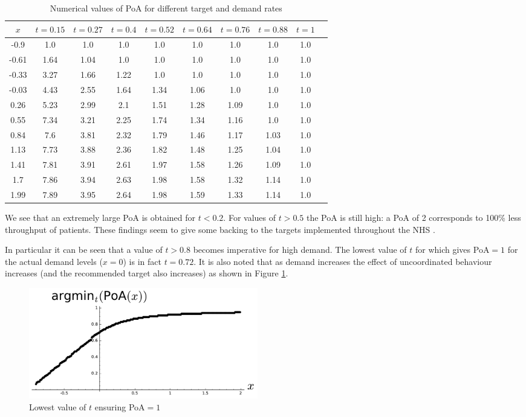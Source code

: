 \documentclass{article}
\begin{document}
\begin{table}[!htbp]
\begin{center}
\begin{tabular}{c|ccccccccc}
\toprule
$x$&$t=0.15$&$t=0.27$&$t=0.4$&$t=0.52$&$t=0.64$&$t=0.76$&$t=0.88$&$t=1$\\
\midrule
-0.9  & 1.0  & 1.0  & 1.0  & 1.0  & 1.0  & 1.0  & 1.0  & 1.0\\
-0.61 & 1.64 & 1.04 & 1.0  & 1.0  & 1.0  & 1.0  & 1.0  & 1.0\\
-0.33 & 3.27 & 1.66 & 1.22 & 1.0  & 1.0  & 1.0  & 1.0  & 1.0\\
-0.03 & 4.43 & 2.55 & 1.64 & 1.34 & 1.06 & 1.0  & 1.0  & 1.0\\
0.26  & 5.23 & 2.99 & 2.1  & 1.51 & 1.28 & 1.09 & 1.0  & 1.0\\
0.55  & 7.34 & 3.21 & 2.25 & 1.74 & 1.34 & 1.16 & 1.0  & 1.0\\
0.84  & 7.6  & 3.81 & 2.32 & 1.79 & 1.46 & 1.17 & 1.03 & 1.0\\
1.13  & 7.73 & 3.88 & 2.36 & 1.82 & 1.48 & 1.25 & 1.04 & 1.0\\
1.41  & 7.81 & 3.91 & 2.61 & 1.97 & 1.58 & 1.26 & 1.09 & 1.0\\
1.7   & 7.86 & 3.94 & 2.63 & 1.98 & 1.58 & 1.32 & 1.14 & 1.0\\
1.99  & 7.89 & 3.95 & 2.64 & 1.98 & 1.59 & 1.33 & 1.14 & 1.0\\
\bottomrule
\end{tabular}
\end{center}
\caption{Numerical values of PoA for different target and demand rates}\label{tabletargetdemandm1}
\end{table}

We see that an extremely large PoA is obtained for $t<0.2$.
For values of $t>0.5$ the PoA is still high: a PoA of 2 corresponds to 100\% less throughput of patients.
These findings seem to give some backing to the targets implemented throughout the NHS \cite{Bevan2006}.

In particular it can be seen that a value of $t>0.8$ becomes imperative for high demand.
The lowest value of $t$ for which gives PoA$=1$ for the actual demand levels ($x=0$) is in fact $t=0.72$.
It is also noted that as demand increases the effect of uncoordinated behaviour increases (and the recommended target also increases) as shown in Figure \ref{mintargetvdemand}.

\begin{figure}[!htbp]
\begin{center}
\includegraphics[width=10cm]{./Images/argminPoAmodel1.pdf}
\caption{Lowest value of $t$ ensuring PoA$=1$} \label{mintargetvdemand}
\end{center}
\end{figure}
\end{document}
